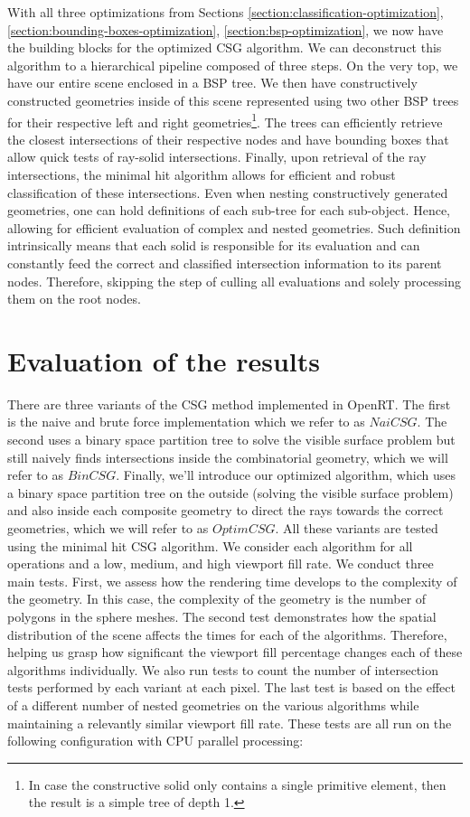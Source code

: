 \documentclass[a4paper,11pt,oneside]{article}
\begin{document}
With all three optimizations from Sections \ref{section:classification-optimization}, \ref{section:bounding-boxes-optimization}, \ref{section:bsp-optimization}, we now have the building blocks for the optimized CSG algorithm. We can deconstruct this algorithm to a hierarchical pipeline composed of three steps. On the very top, we have our entire scene enclosed in a BSP tree. We then have constructively constructed geometries inside of this scene represented using two other BSP trees for their respective left and right geometries\footnote{In case the constructive solid only contains a single primitive element, then the result is a simple tree of depth 1.}. The trees can efficiently retrieve the closest intersections of their respective nodes and have bounding boxes that allow quick tests of ray-solid intersections. Finally, upon retrieval of the ray intersections, the minimal hit algorithm allows for efficient and robust classification of these intersections. Even when nesting constructively generated geometries, one can hold definitions of each sub-tree for each sub-object. Hence, allowing for efficient evaluation of complex and nested geometries.  Such definition intrinsically means that each solid is responsible for its evaluation and can constantly feed the correct and classified intersection information to its parent nodes. Therefore, skipping the step of culling all evaluations and solely processing them on the root nodes.

\section{Evaluation of the results}

There are three variants of the CSG method implemented in OpenRT. The first is the naive and brute force implementation which we refer to as $NaiCSG$. The second uses a binary space partition tree to solve the visible surface problem but still naively finds intersections inside the combinatorial geometry, which we will refer to as $BinCSG$. Finally, we'll introduce our optimized algorithm, which uses a binary space partition tree on the outside (solving the visible surface problem) and also inside each composite geometry to direct the rays towards the correct geometries, which we will refer to as $OptimCSG$. All these variants are tested using the minimal hit CSG algorithm. We consider each algorithm for all operations and a low, medium, and high viewport fill rate. We conduct three main tests. First, we assess how the rendering time develops to the complexity of the geometry. In this case, the complexity of the geometry is the number of polygons in the sphere meshes. The second test demonstrates how the spatial distribution of the scene affects the times for each of the algorithms. Therefore, helping us grasp how significant the viewport fill percentage changes each of these algorithms individually. We also run tests to count the number of intersection tests performed by each variant at each pixel. The last test is based on the effect of a different number of nested geometries on the various algorithms while maintaining a relevantly similar viewport fill rate. These tests are all run on the following configuration with CPU parallel processing:
\end{document}
